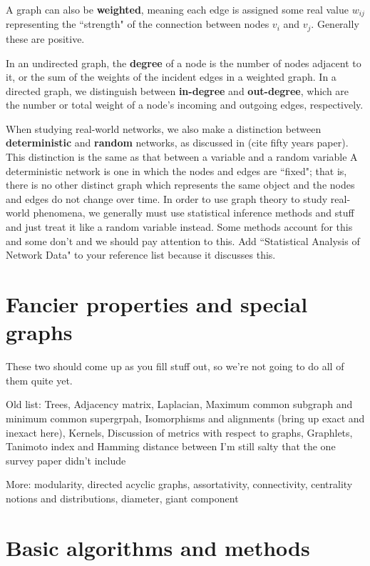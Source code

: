 \documentclass[12pt]{thesis}
\theoremstyle{plain}
\theoremstyle{definition}
\theoremstyle{remark}
\begin{document}
A graph can also be \textbf{weighted}, meaning each edge is assigned some real value $w_{ij}$ representing the ``strength" of the connection between nodes $v_i$ and $v_j$. Generally these are positive.

In an undirected graph, the \textbf{degree} of a node is the number of nodes adjacent to it, or the sum of the weights of the incident edges in a weighted graph. In a directed graph, we distinguish between \textbf{in-degree} and \textbf{out-degree}, which are the number or total weight of a node's incoming and outgoing edges, respectively.

When studying real-world networks, we also make a distinction between \textbf{deterministic} and \textbf{random} networks, as discussed in (cite fifty years paper). This distinction is the same as that between a variable and a random variable A deterministic network is one in which the nodes and edges are ``fixed"; that is, there is no other distinct graph which represents the same object and the nodes and edges do not change over time. In order to use graph theory to study real-world phenomena, we generally must use statistical inference methods and stuff and just treat it like a random variable instead. Some methods account for this and some don't and we should pay attention to this. Add ``Statistical Analysis of Network Data" to your reference list because it discusses this.


\section{Fancier properties and special graphs} %


These two should come up as you fill stuff out, so we're not going to do all of them quite yet.

Old list: Trees, Adjacency matrix, Laplacian, Maximum common subgraph and minimum common supergrpah, Isomorphisms and alignments (bring up exact and inexact here), Kernels, Discussion of metrics with respect to graphs, Graphlets, Tanimoto index and Hamming distance between I'm still salty that the one survey paper didn't include

More: modularity, directed acyclic graphs, assortativity, connectivity, centrality notions and distributions, diameter, giant component

\section{Basic algorithms and methods}
\end{document}
